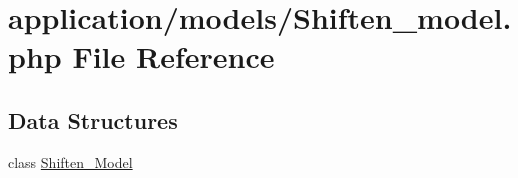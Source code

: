 \hypertarget{_shiften__model_8php}{}\section{application/models/\+Shiften\+\_\+model.php File Reference}
\label{_shiften__model_8php}
\subsection*{Data Structures}
\begin{DoxyCompactItemize}
\item 
class \mbox{\hyperlink{class_shiften___model}{Shiften\+\_\+\+Model}}
\end{DoxyCompactItemize}
